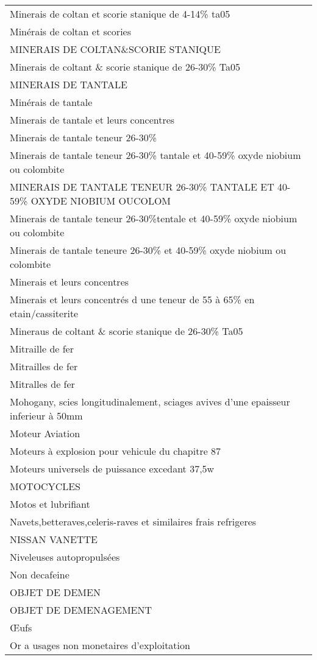 \documentclass[
]{book}
\begin{document}
\begin{longtable}[t]{l}
\addlinespace
Minerais de coltan et scorie stanique de 4-14\% ta05\\
Minérais de coltan et scories\\
MINERAIS DE COLTAN\&SCORIE STANIQUE\\
Minerais de coltant \& scorie stanique de 26-30\% Ta05\\
MINERAIS DE TANTALE\\
\addlinespace
Minérais de tantale\\
Minerais de tantale et leurs concentres\\
Minerais de tantale teneur 26-30\%\\
Minerais de tantale teneur 26-30\% tantale et 40-59\% oxyde niobium ou colombite\\
MINERAIS DE TANTALE TENEUR 26-30\% TANTALE ET 40-59\% OXYDE NIOBIUM OUCOLOM\\
\addlinespace
Minerais de tantale teneur 26-30\%tentale et 40-59\% oxyde niobium ou colombite\\
Minerais de tantale teneure 26-30\% et 40-59\% oxyde niobium ou colombite\\
Minerais et leurs concentres\\
Minerais et leurs concentrés d une teneur de 55 à 65\% en etain/cassiterite\\
Mineraus de coltant \& scorie stanique de 26-30\% Ta05\\
\addlinespace
Mitraille de fer\\
Mitrailles de fer\\
Mitralles de fer\\
Mohogany, scies longitudinalement, sciages avives d'une epaisseur inferieur à 50mm\\
Moteur Aviation\\
\addlinespace
Moteurs à explosion pour vehicule du chapitre 87\\
Moteurs universels de puissance excedant 37,5w\\
MOTOCYCLES\\
Motos et lubrifiant\\
Navets,betteraves,celeris-raves et similaires frais refrigeres\\
\addlinespace
NISSAN VANETTE\\
Niveleuses autopropulsées\\
Non decafeine\\
OBJET DE DEMEN\\
OBJET DE DEMENAGEMENT\\
\addlinespace
Œufs\\
Or a usages non monetaires d'exploitation\\

\end{longtable}
\end{document}
